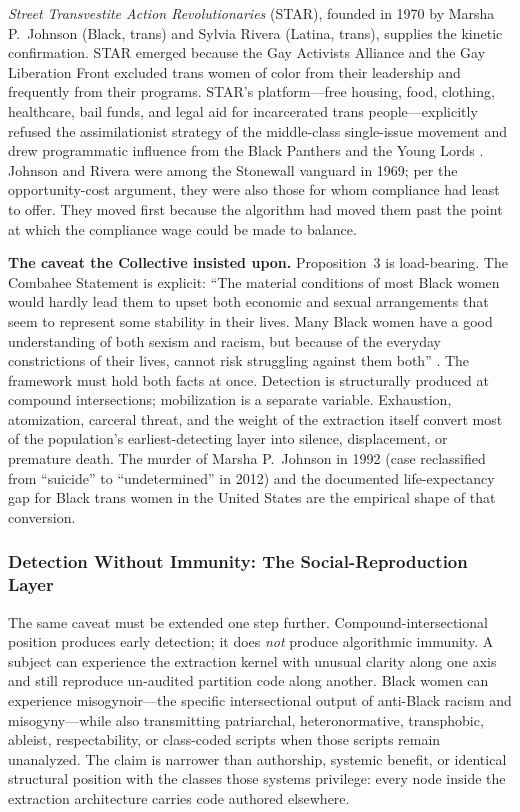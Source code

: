 \textit{Street Transvestite Action Revolutionaries} (STAR), founded in 1970 by Marsha P.\ Johnson (Black, trans) and Sylvia Rivera (Latina, trans), supplies the kinetic confirmation. STAR emerged because the Gay Activists Alliance and the Gay Liberation Front excluded trans women of color from their leadership and frequently from their programs. STAR's platform---free housing, food, clothing, healthcare, bail funds, and legal aid for incarcerated trans people---explicitly refused the assimilationist strategy of the middle-class single-issue movement and drew programmatic influence from the Black Panthers and the Young Lords \cite{star_history}. Johnson and Rivera were among the Stonewall vanguard in 1969; per the opportunity-cost argument, they were also those for whom compliance had least to offer. They moved first because the algorithm had moved them past the point at which the compliance wage could be made to balance.

\noindent\textbf{The caveat the Collective insisted upon.} Proposition~3 is load-bearing. The Combahee Statement is explicit: ``The material conditions of most Black women would hardly lead them to upset both economic and sexual arrangements that seem to represent some stability in their lives. Many Black women have a good understanding of both sexism and racism, but because of the everyday constrictions of their lives, cannot risk struggling against them both'' \cite{combahee1977}. The framework must hold both facts at once. Detection is structurally produced at compound intersections; mobilization is a separate variable. Exhaustion, atomization, carceral threat, and the weight of the extraction itself convert most of the population's earliest-detecting layer into silence, displacement, or premature death. The murder of Marsha P.\ Johnson in 1992 (case reclassified from ``suicide'' to ``undetermined'' in 2012) and the documented life-expectancy gap for Black trans women in the United States are the empirical shape of that conversion.

\subsubsection*{Detection Without Immunity: The Social-Reproduction Layer}

The same caveat must be extended one step further. Compound-intersectional position produces early detection; it does \textit{not} produce algorithmic immunity. A subject can experience the extraction kernel with unusual clarity along one axis and still reproduce un-audited partition code along another. Black women can experience misogynoir---the specific intersectional output of anti-Black racism and misogyny---while also transmitting patriarchal, heteronormative, transphobic, ableist, respectability, or class-coded scripts when those scripts remain unanalyzed. The claim is narrower than authorship, systemic benefit, or identical structural position with the classes those systems privilege: every node inside the extraction architecture carries code authored elsewhere.

